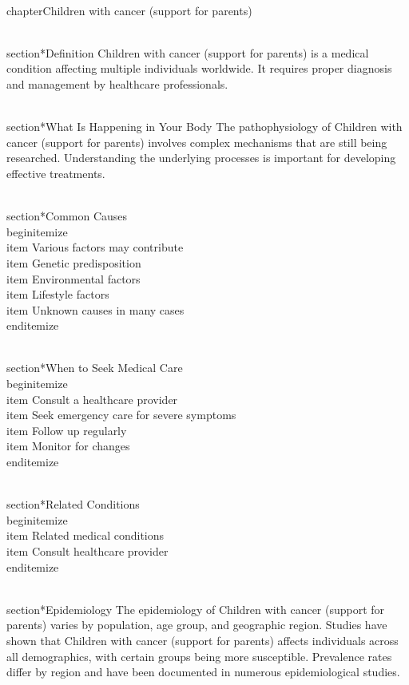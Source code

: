
\\chapter{Children with cancer (support for parents)}

\\section*{Definition}
Children with cancer (support for parents) is a medical condition affecting multiple individuals worldwide. It requires proper diagnosis and management by healthcare professionals.

\\section*{What Is Happening in Your Body}
The pathophysiology of Children with cancer (support for parents) involves complex mechanisms that are still being researched. Understanding the underlying processes is important for developing effective treatments.

\\section*{Common Causes}
\\begin{itemize}
\\item Various factors may contribute\n  \\item Genetic predisposition\n  \\item Environmental factors\n  \\item Lifestyle factors\n  \\item Unknown causes in many cases
\\end{itemize}

\\section*{When to Seek Medical Care}
\\begin{itemize}
\\item Consult a healthcare provider\n  \\item Seek emergency care for severe symptoms\n  \\item Follow up regularly\n  \\item Monitor for changes
\\end{itemize}

\\section*{Related Conditions}
\\begin{itemize}
\\item Related medical conditions\n  \\item Consult healthcare provider
\\end{itemize}

\\section*{Epidemiology}
The epidemiology of Children with cancer (support for parents) varies by population, age group, and geographic region. Studies have shown that Children with cancer (support for parents) affects individuals across all demographics, with certain groups being more susceptible. Prevalence rates differ by region and have been documented in numerous epidemiological studies.

